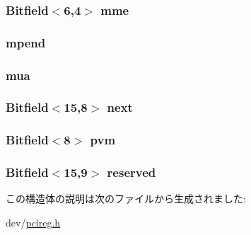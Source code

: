 \label{structMSICAP_a4a27e96090da8042a60766ea625bb797}
\hypertarget{structMSICAP_ad7519721bdd4a75f416d21a731ff99eb}{
\subsubsection[{mme}]{\setlength{\rightskip}{0pt plus 5cm}Bitfield$<$6,4$>$ {\bf mme}}}
\label{structMSICAP_ad7519721bdd4a75f416d21a731ff99eb}
\hypertarget{structMSICAP_a685bd69c2511bc3608ff81274f9d98e4}{
\subsubsection[{mpend}]{ {\bf mpend}}}
\label{structMSICAP_a685bd69c2511bc3608ff81274f9d98e4}
\hypertarget{structMSICAP_a92338cdf88f1b13102045767d158cbdd}{
\subsubsection[{mua}]{ {\bf mua}}}
\label{structMSICAP_a92338cdf88f1b13102045767d158cbdd}
\hypertarget{structMSICAP_a8bb6f66c6230d47ae653bb69bad27694}{
\subsubsection[{next}]{\setlength{\rightskip}{0pt plus 5cm}Bitfield$<$15,8$>$ {\bf next}}}
\label{structMSICAP_a8bb6f66c6230d47ae653bb69bad27694}
\hypertarget{structMSICAP_ac70f85dad2be90a16be83b36b3255f5b}{
\subsubsection[{pvm}]{\setlength{\rightskip}{0pt plus 5cm}Bitfield$<$8$>$ {\bf pvm}}}
\label{structMSICAP_ac70f85dad2be90a16be83b36b3255f5b}
\hypertarget{structMSICAP_a66f538babc389986738ec70104e0562b}{
\subsubsection[{reserved}]{}}
\label{structMSICAP_a66f538babc389986738ec70104e0562b}
\hypertarget{structMSICAP_af8a210cfdab0375312b26552c8144f78}{
\subsubsection[{reserved}]{\setlength{\rightskip}{0pt plus 5cm}Bitfield$<$15,9$>$ {\bf reserved}}}
\label{structMSICAP_af8a210cfdab0375312b26552c8144f78}


この構造体の説明は次のファイルから生成されました:\begin{DoxyCompactItemize}
\item 
dev/\hyperlink{pcireg_8h}{pcireg.h}\end{DoxyCompactItemize}
